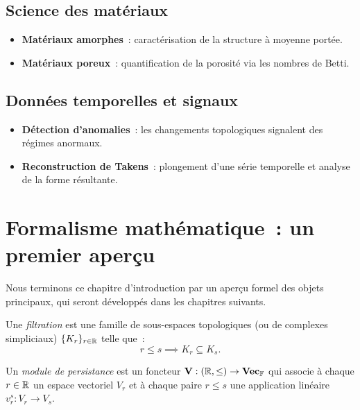 \subsection{Science des mat\'eriaux}
\begin{itemize}
  \item \textbf{Mat\'eriaux amorphes}~: caract\'erisation de la
        structure \`a moyenne port\'ee.
  \item \textbf{Mat\'eriaux poreux}~: quantification de la porosit\'e
        via les nombres de Betti.
\end{itemize}

\subsection{Donn\'ees temporelles et signaux}
\begin{itemize}
  \item \textbf{D\'etection d'anomalies}~: les changements topologiques
        signalent des r\'egimes anormaux.
  \item \textbf{Reconstruction de Takens}~: plongement d'une s\'erie
        temporelle et analyse de la forme r\'esultante.
\end{itemize}

\section{Formalisme math\'ematique~: un premier aper\c{c}u}

Nous terminons ce chapitre d'introduction par un aper\c{c}u formel des
objets principaux, qui seront d\'evelopp\'es dans les chapitres suivants.

\begin{definition}[Filtration]
Une \emph{filtration} est une famille de sous-espaces topologiques
(ou de complexes simpliciaux) $\{K_r\}_{r \in \mathbb{R}}$ telle que~:
\[
  r \leq s \implies K_r \subseteq K_s.
\]
\end{definition}

\begin{definition}
Un \emph{module de persistance} est un foncteur
$\mathbf{V} : (\mathbb{R}, \leq) \to \mathbf{Vec}_\mathbb{F}$ qui associe \`a
chaque $r \in \mathbb{R}$ un espace vectoriel $V_r$ et \`a chaque paire $r \leq s$
une application lin\'eaire $v_r^s : V_r \to V_s$.
\end{definition}

